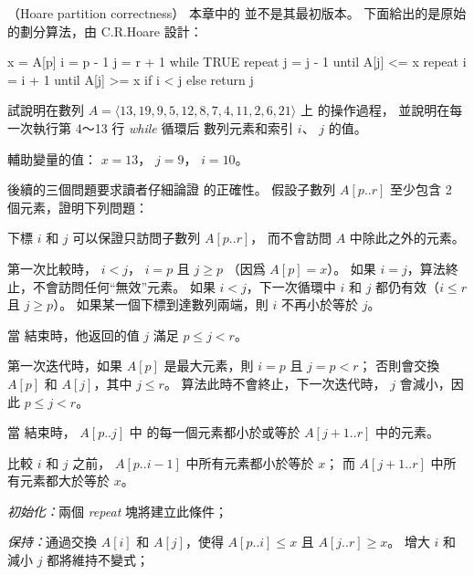 \startPROBLEM
（Hoare partition correctness）
本章中的  並不是其最初版本。
下面給出的是原始的劃分算法，由 C.R.Hoare 設計：

\startCLRSCODE
x = A[p]
i = p - 1
j = r + 1
while TRUE
	repeat
		j = j - 1
	until A[j] <= x
	repeat
		i = i + 1
	until A[j] >= x
	if i < j
	else
		return j
\stopCLRSCODE
\startigBase[a]
\item 試說明在數列 $A = \langle 13, 19, 9, 5, 12, 8, 7, 4, 11, 2, 6, 21 \rangle$ 上
  的操作過程，
並說明在每一次執行第 4～13 行 \emph{while} 循環后
數列元素和索引 $i$、 $j$ 的值。
\stopigBase

\startANSWER
輔助變量的值： $x = 13$， $j = 9$， $i = 10$。

{\externalfigure[output/p7_1_a-1]}
{\externalfigure[output/p7_1_a-2]}
{\externalfigure[output/p7_1_a-3]}
\stopANSWER

後續的三個問題要求讀者仔細論證  的正確性。
假設子數列 $A[p..r]$ 至少包含 2 個元素，證明下列問題：
\startigBase[a,continue]
\item 下標 $i$ 和 $j$ 可以保證只訪問子數列 $A[p..r]$，
而不會訪問 $A$ 中除此之外的元素。
\stopigBase

\startANSWER
第一次比較時， $i < j$， $i=p$ 且 $j\ge p$ （因爲 $A[p]=x$）。
如果 $i=j$，算法終止，不會訪問任何“無效”元素。
如果 $i<j$，下一次循環中 $i$ 和 $j$ 都仍有效（$i\le r$ 且 $j\ge p$）。
如果某一個下標到達數列兩端，則 $i$ 不再小於等於 $j$。
\stopANSWER

\startigBase[a,continue]
\item 當  結束時，他返回的值 $j$ 滿足 $p\le j < r$。
\stopigBase

\startANSWER
第一次迭代時，如果 $A[p]$ 是最大元素，則 $i=p$ 且 $j=p<r$；
否則會交換 $A[p]$ 和 $A[j]$，其中 $j\le r$。
算法此時不會終止，下一次迭代時， $j$ 會減小，因此 $p\le j < r$。
\stopANSWER

\startigBase[a,continue]
\item 當  結束時， $A[p..j]$ 中
的每一個元素都小於或等於 $A[j+1..r]$ 中的元素。
\stopigBase

\startANSWER
比較 $i$ 和 $j$ 之前， $A[p..i-1]$ 中所有元素都小於等於 $x$；
而 $A[j+1..r]$ 中所有元素都大於等於 $x$。

\emph{初始化：}兩個 \emph{repeat} 塊將建立此條件；

\emph{保持：}通過交換 $A[i]$ 和 $A[j]$，使得 $A[p..i]\le x$ 且 $A[j..r]\ge x$。
增大 $i$ 和減小 $j$ 都將維持不變式；

